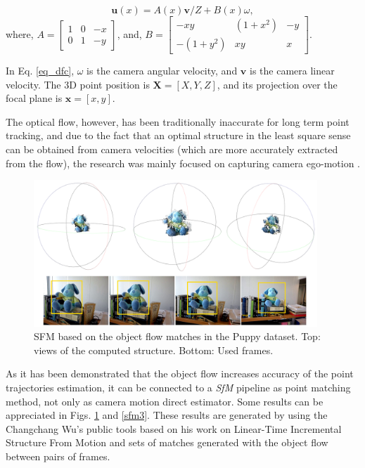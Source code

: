 \begin{equation}
\textbf{u}(x) = A(x)\textbf{v}/Z + B(x)\omega ,
\label{eq_dfc}
\end{equation}
 where, $ A =  \left[ {\begin{array}{ccc} 1 & 0 & -x\\ 0 & 1 & -y \end{array} } \right]$, 
 and, $ B =  \left[ {\begin{array}{ccc} -xy & (1+x^2) & -y\\ -(1+y^2) & xy & x \end{array} } \right]$.

In Eq. \ref{eq_dfc}, $\omega$ is 
the camera angular velocity, and $\textbf{v}$ is the camera linear velocity. 
The 3D point position is 
 $\textbf{X}=[X,Y,Z]$, and its 
 projection over the focal plane is 
 $\textbf{x}=[x,y]$.
 

The optical flow, however, has been traditionally 
inaccurate for long term point tracking, and due to the fact that an optimal structure in the least square sense can 
be obtained from camera velocities (which are more accurately extracted from the flow), the research was 
mainly focused on capturing camera ego-motion \cite{c43}. 

   \begin{figure}[tpbh]
      \centering
      \includegraphics[width=0.95\textwidth]{../images/SFM2.png}
      \caption{ SFM based on the object flow matches in the Puppy dataset. Top: views of the computed structure. Bottom: Used frames. }
      \label{sfm2}
   \end{figure}
   
As it has been demonstrated that the object flow 
increases accuracy of the point trajectories estimation, it can be connected to a {\it SfM} 
pipeline as point matching method, not only as camera motion direct estimator. Some results can be appreciated in Figs. \ref{sfm2} and \ref{sfm3}. These results are generated 
by using the Changchang Wu's public tools based on his work on Linear-Time Incremental Structure From Motion \cite{c42} and sets of matches generated 
with the object flow between pairs of frames.
   
